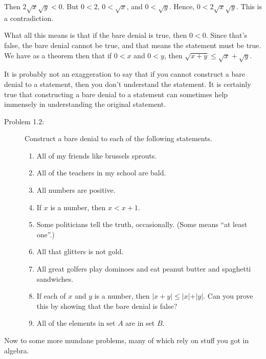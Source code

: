 \documentclass[english]{book}
\begin{document}
Then $2 \sqrt{x} \sqrt{y} < 0$. But $0<2$, $0 < \sqrt{x}$, and $0 < \sqrt{y}$. Hence, $0 < 2 \sqrt{x} \sqrt{y}$. This is a contradiction.

What all this means is that if the bare denial is true, then $0<0$. Since that's false, the bare denial cannot be true, and that means the statement must be true. We have as a theorem then that if $0<x$ and $0<y$, then $\sqrt{x+y} \leq \sqrt{x} + \sqrt{y}$.

It is probably not an exaggeration to say that if you cannot construct a bare denial to a statement, then you don't understand the statement. It is certainly true that constructing a bare denial to a statement can sometimes help immensely in understanding the original statement.

\begin{description}
\item[Problem 1.2:] Construct a bare denial to each of the following statements.
  \begin{enumerate}[\hspace{1cm}1)]
    \item All of my friends like brussels sprouts.
    \item All of the teachers in my school are bald.
    \item All numbers are positive.
    \item If $x$ is a number, then $x<x+1$.
    \item Some politicians tell the truth, occasionally. (Some means ``at least one''.)
    \item All that glitters is not gold.
    \item All great golfers play dominoes and eat peanut butter and spaghetti sandwiches.
    \item If each of $x$ and $y$ is a number, then $\vert x+y \vert  \leq  \vert x \vert + \vert y \vert$. Can you prove this by showing that the bare denial is false?
    \item All of the elements in set $A$ are in set $B$. 
  \end{enumerate}
\end{description}

Now to some more mundane problems, many of which rely on stuff you got in algebra.
\end{document}
